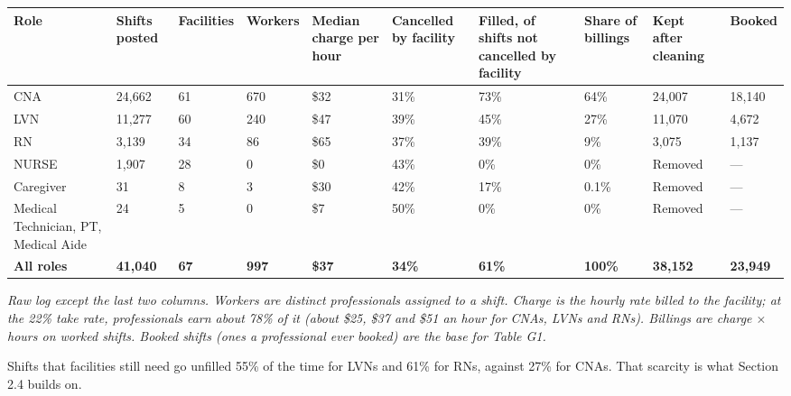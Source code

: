 \begin{center}\small\setlength{\tabcolsep}{4pt}
\begin{tabularx}{\textwidth}{@{}LR{1.2cm}R{1.4cm}R{1.1cm}R{1.4cm}R{1.4cm}R{1.8cm}R{1.2cm}R{1.4cm}R{1.1cm}@{}}
\toprule
Role & Shifts posted & Facilities & Workers & Median charge per hour & Cancelled by facility & Filled, of shifts not
cancelled by facility & Share of billings & Kept after cleaning & Booked \\
\midrule
CNA & 24,662 & 61 & 670 & \$32 & 31\% & 73\% & 64\% & 24,007 & 18,140 \\
LVN & 11,277 & 60 & 240 & \$47 & 39\% & 45\% & 27\% & 11,070 & 4,672 \\
RN & 3,139 & 34 & 86 & \$65 & 37\% & 39\% & 9\% & 3,075 & 1,137 \\
NURSE & 1,907 & 28 & 0 & \$0 & 43\% & 0\% & 0\% & Removed & --- \\
Caregiver & 31 & 8 & 3 & \$30 & 42\% & 17\% & \lthan{}0.1\% & Removed & --- \\
Medical Technician, PT, Medical Aide & 24 & 5 & 0 & \$7 & 50\% & 0\% & 0\% & Removed & --- \\
\midrule
\textbf{All roles} & \textbf{41,040} & \textbf{67} & \textbf{997} & \textbf{\$37} & \textbf{34\%} & \textbf{61\%} &
\textbf{100\%} & \textbf{38,152} & \textbf{23,949} \\
\bottomrule
\end{tabularx}
\end{center}
{\small\textit{Raw log except the last two columns. Workers are distinct professionals assigned to a shift. Charge is the
hourly rate billed to the facility; at the 22\% take rate, professionals earn about 78\% of it (about \$25, \$37 and \$51
an hour for CNAs, LVNs and RNs). Billings are charge $\times$ hours on worked shifts. Booked shifts (ones a professional
ever booked) are the base for Table G1.}}

Shifts that facilities still need go unfilled 55\% of the time for LVNs and 61\% for RNs, against 27\% for CNAs. That
scarcity is what Section 2.4 builds on.

